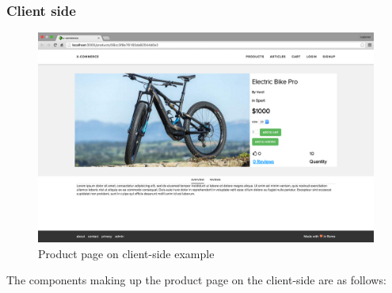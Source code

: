 \subsubsection{Client side}
\begin{figure}[htb]
\centering
\includegraphics[width=1.0\linewidth]{images/chapter4/product-page-ex3.png}\hfill
\caption[Product page on client-side]{Product page on client-side example}
\label{fig:design_page_prod_cli}
\end{figure}
The components making up the product page on the client-side are as follows:


